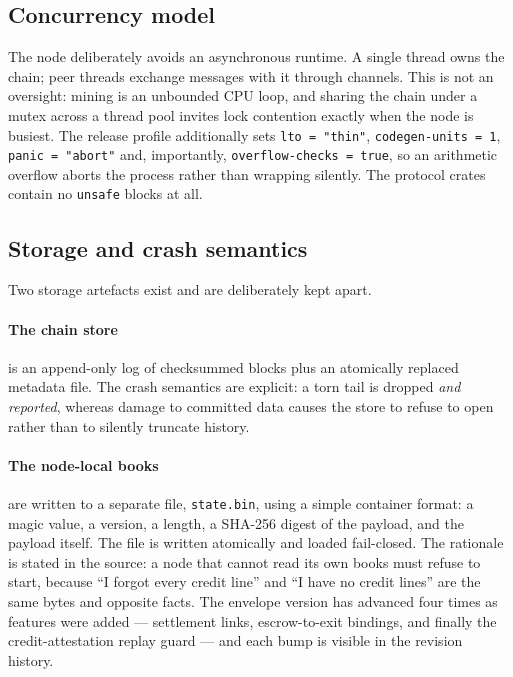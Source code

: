 \documentclass{article}
\begin{document}
\subsection{Concurrency model}

The node deliberately avoids an asynchronous runtime. A single thread owns the
chain; peer threads exchange messages with it through channels. This is not an
oversight: mining is an unbounded CPU loop, and sharing the chain under a mutex
across a thread pool invites lock contention exactly when the node is busiest.
The release profile additionally sets \texttt{lto = "thin"},
\texttt{codegen-units = 1}, \texttt{panic = "abort"} and, importantly,
\texttt{overflow-checks = true}, so an arithmetic overflow aborts the process
rather than wrapping silently. The protocol crates contain no \texttt{unsafe}
blocks at all.

\subsection{Storage and crash semantics}

Two storage artefacts exist and are deliberately kept apart.

\paragraph{The chain store} is an append-only log of checksummed blocks plus an
atomically replaced metadata file. The crash semantics are explicit: a torn
tail is dropped \emph{and reported}, whereas damage to committed data causes
the store to refuse to open rather than to silently truncate history.

\paragraph{The node-local books} are written to a separate file,
\texttt{state.bin}, using a simple container format:
a magic value, a version, a length, a SHA-256 digest of the payload, and the
payload itself. The file is written atomically and loaded fail-closed. The
rationale is stated in the source: a node that cannot read its own books must
refuse to start, because ``I forgot every credit line'' and ``I have no credit
lines'' are the same bytes and opposite facts. The envelope version has advanced
four times as features were added --- settlement links, escrow-to-exit
bindings, and finally the credit-attestation replay guard --- and each bump is
visible in the revision history.
\end{document}
